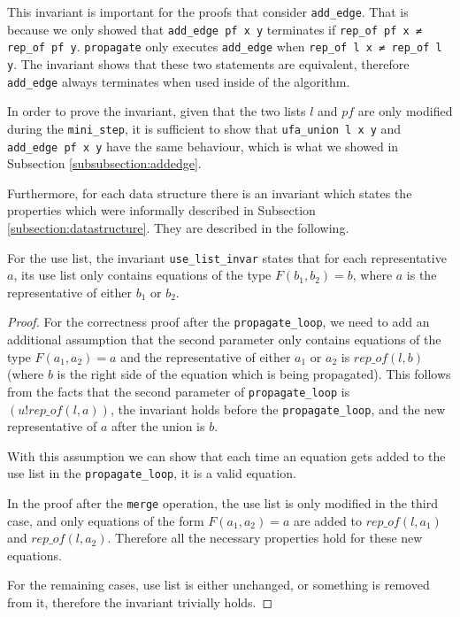 This invariant is important for the proofs that consider \lstinline{add_edge}. That is because we only showed that \lstinline{add_edge pf x y} terminates if \lstinline{rep_of pf x ≠ rep_of pf y}. \lstinline{propagate} only executes \lstinline{add_edge} when \lstinline{rep_of l x ≠ rep_of l y}. The invariant shows that these two statements are equivalent, therefore \lstinline{add_edge} always terminates when used inside of the algorithm.

In order to prove the invariant, given that the two lists $l$ and $pf$ are only modified during the \lstinline{mini_step}, it is sufficient to show that \lstinline{ufa_union l x y} and \lstinline{add_edge pf x y} have the same behaviour, which is what we showed in Subsection \ref{subsubsection:addedge}.

Furthermore, for each data structure there is an invariant which states the properties which were informally described in Subsection \ref{subsection:datastructure}. They are described in the following.

For the use list, the invariant \lstinline|use_list_invar| states that for each representative $a$, its use list only contains equations of the type $F(b_1, b_2) = b$, where $a$ is the representative of either $b_1$ or $b_2$.

\begin{proof}
For the correctness proof after the \lstinline{propagate_loop}, we need to add an additional assumption that the second parameter only contains equations of the type $F(a_1, a_2) = a$ and the representative of either $a_1$ or $a_2$ is $rep\_of(l, b)$ (where $b$ is the right side of the equation which is being propagated). This follows from the facts that the second parameter of \lstinline{propagate_loop} is $(u ! rep\_of(l, a))$, the invariant holds before the \lstinline{propagate_loop}, and the new representative of $a$ after the union is $b$.

With this assumption we can show that each time an equation gets added to the use list in the \lstinline{propagate_loop}, it is a valid equation.

In the proof after the \lstinline{merge} operation, the use list is only modified in the third case, and only equations of the form $F(a_1, a_2) = a$ are added to $rep\_of(l, a_1)$  and $rep\_of(l, a_2)$. Therefore all the necessary properties hold for these new equations.

For the remaining cases, use list is either unchanged, or something is removed from it, therefore the invariant trivially holds.
\end{proof}

